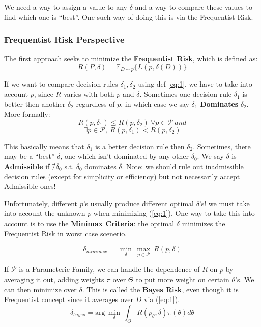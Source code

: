 \documentclass[]{article}
\theoremstyle{mattstyle}
\theoremstyle{definition}
\begin{document}
We need a way to assign a value to any \(\delta\) and a way to compare these values to find which one is ``best''. One such way of doing this is via the Frequentist Risk.

\subsubsection{Frequentist Risk Perspective} 
The first approach seeks to minimize the \textbf{Frequentist Risk}, which is defined as:
\begin{equation}\label{eq:1}
	R(P,\delta)=\mathbb{E}_{D\sim p}\{L(p,\delta(D))\}
\end{equation}

If we want to compare decision rules \(\delta_1, \delta_2\) using def \ref{eq:1}, we have to take into account \(p\), since \(R\) varies with both \(p\) and \(\delta\). Sometimes one decision rule \(\delta_1\) is better then another \(\delta_2\) regardless of \(p\), in which case we say \(\delta_1\) \textbf{Dominates} \(\delta_2\).
More formally:
$$R(p,\delta_1)\leq R(p,\delta_2) \ \forall p \in \mathcal{P}\ and$$
$$\exists p \in \mathcal{P},\ R(p,\delta_1) < R(p, \delta_2)$$

This basically means that \(\delta_1\) is a better decision rule then \(\delta_2\). Sometimes, there may be a ``best'' \(\delta\), one which isn't dominated by any other \(\delta_0\). We say \(\delta\) is \textbf{Admissible} if $\nexists \delta_0$ s.t. $\delta_0$ dominates $\delta$. Note: we should rule out inadmissible decision rules (except for simplicity or efficiency) but not necessarily accept Admissible ones!

Unfortunately, different \(p\)'s usually produce different optimal \(\delta\)'s! we must take into account the unknown \(p\) when minimizing (\ref{eq:1}). One way to take this into account is to use the \textbf{Minimax Criteria}: the optimal \(\delta\) minimizes the Frequentist Risk in worst case scenerio.

\begin{equation}\delta_{minimax} = \,\min\limits_{\delta}\,\max\limits_{p \in \mathcal{P}}\ R(p,\delta)
\end{equation}

If \(\mathcal{P}\) is a Parameteric Family, we can handle the dependence of \(R\) on \(p\) by averaging it out, adding weights \(\pi\) over $\Theta$ to put more weight on certain $\theta$'s. We can then minimize over \(\delta\). This is called the \textbf{Bayes Risk}, even though it is Frequentist concept since it averages over $D$ via (\ref{eq:1}).
\begin{equation}\label{eq:3}
\delta_{bayes}= \text{arg}\,\min\limits_{\delta}\,\int_{\Theta}^{}R(p_\theta,\delta)\pi(\theta)d\theta
\end{equation}
\end{document}
